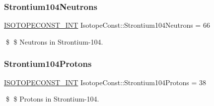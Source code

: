 \subsubsection{\texorpdfstring{Strontium104\+Neutrons}{Strontium104Neutrons}}
{\footnotesize\ttfamily \mbox{\hyperlink{group___isotope_const-_macros_ga5f18360b3e99483a35c32d789e62621c}{I\+S\+O\+T\+O\+P\+E\+C\+O\+N\+S\+T\+\_\+\+I\+NT}} Isotope\+Const\+::\+Strontium104\+Neutrons = 66}

\$ \$ Neutrons in Strontium-\/104. \mbox{\label{group___isotope_const-_strontium-_sr104_ga44cab490ac1ee76f43502d702f51f67a}} 
\subsubsection{\texorpdfstring{Strontium104\+Protons}{Strontium104Protons}}
{\footnotesize\ttfamily \mbox{\hyperlink{group___isotope_const-_macros_ga5f18360b3e99483a35c32d789e62621c}{I\+S\+O\+T\+O\+P\+E\+C\+O\+N\+S\+T\+\_\+\+I\+NT}} Isotope\+Const\+::\+Strontium104\+Protons = 38}

\$ \$ Protons in Strontium-\/104. 